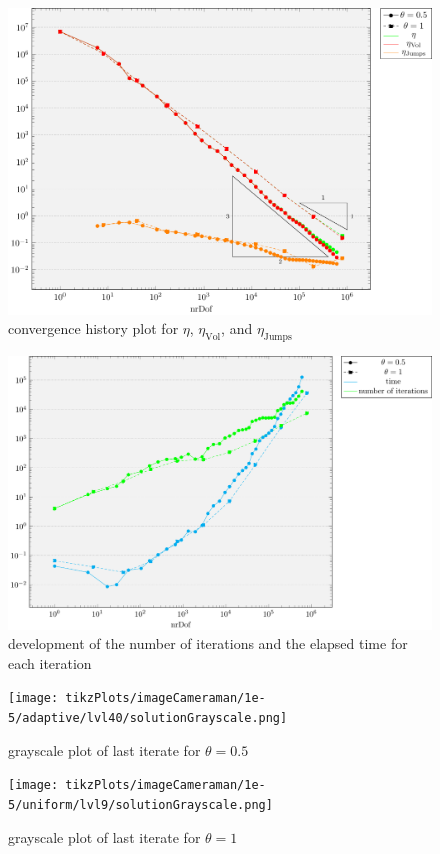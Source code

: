 \documentclass[draft=false,twoside,12pt]{scrreprt}
\begin{document}
\begin{figure}[H]
	\centering
	\includegraphics[width=14cm]
  {tikzPlots/imageCameraman/convergence.pdf}
  \caption{convergence history plot for $\eta$,
  $\eta_\text{Vol}$, and $\eta_\text{Jumps}$}
\end{figure}

\begin{figure}[H]
	\centering
	\includegraphics[width=14cm]{tikzPlots/imageCameraman/misc.pdf}
  \caption{development of the number of iterations and the elapsed time for 
  each iteration}
\end{figure}

\begin{minipage}[t]{0.5\textwidth}
  \begin{figure}[H]
	  \centering
		\texttt{[image: tikzPlots/imageCameraman/1e-5/adaptive/lvl40/solutionGrayscale.png]}
    \caption{grayscale plot of last iterate for $\theta = 0.5$}
  \end{figure}
\end{minipage}
\begin{minipage}[t]{0.5\textwidth}
  \begin{figure}[H]
	  \centering
		\texttt{[image: tikzPlots/imageCameraman/1e-5/uniform/lvl9/solutionGrayscale.png]}
    \caption{grayscale plot of last iterate for $\theta = 1$}
  \end{figure}
\end{minipage}
\end{document}
